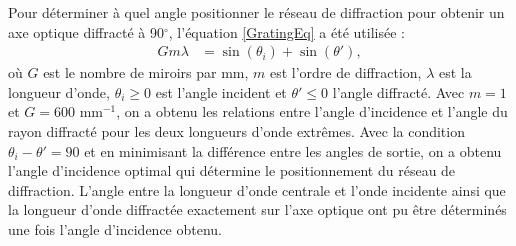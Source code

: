 \documentclass[conference]{IEEEtran}
\begin{document}
Pour déterminer à quel angle positionner le réseau de diffraction pour 
obtenir un axe optique diffracté à 90$^{\circ}$, l'équation \ref{GratingEq} a été utilisée \cite{plymouth_grating_equation}:
\begin{align}\label{GratingEq}
    G m \lambda &= \sin(\theta_i) + \sin(\theta'),
\end{align}
où $G$ est le nombre de miroirs par mm, $m$ est l'ordre de diffraction, $\lambda$ est la longueur d'onde,
$\theta_i \ge 0$ est l'angle incident et $\theta' \le 0$ l'angle diffracté. Avec $m=1$ et $G=600\text{ mm}^{-1}$,
on a obtenu les relations entre l'angle d'incidence et l'angle du rayon diffracté pour les deux longueurs 
d'onde extrêmes. Avec la condition $\theta_i-\theta'=90$ et en minimisant la différence entre les angles 
de sortie, on a obtenu l'angle d'incidence optimal qui détermine le positionnement du réseau de diffraction.
L'angle entre la longueur d'onde centrale et l'onde incidente ainsi que la longueur d'onde diffractée 
exactement sur l'axe optique ont pu être déterminés une fois l'angle d'incidence obtenu.
\end{document}
